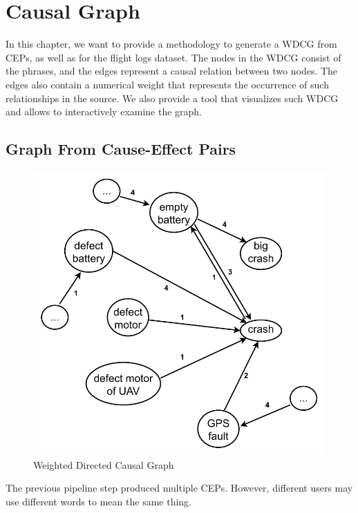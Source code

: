 \chapter{Causal Graph}\label{ch:causal-graph}
In this chapter, we want to provide a methodology to generate a \ac{WDCG} from \ac{CEP}s, as well as for the flight logs dataset.
The nodes in the \ac{WDCG} consist of the phrases, and the edges represent a causal relation between two nodes.
The edges also contain a numerical weight that represents the occurrence of such relationships in the source.
We also provide a tool that visualizes such \ac{WDCG} and allows to interactively examine the graph.


\section{Graph From Cause-Effect Pairs}\label{sec:graph-from-cause-effect-pairs}
\begin{figure}
    \begin{center}
        \includegraphics[scale=.6]{figures/causal_graph/causal_graph}
        \caption{Weighted Directed Causal Graph}\label{fig:causal-graph}
    \end{center}
\end{figure}
The previous pipeline step produced multiple \ac{CEP}s.
However, different users may use different words to mean the same thing.
